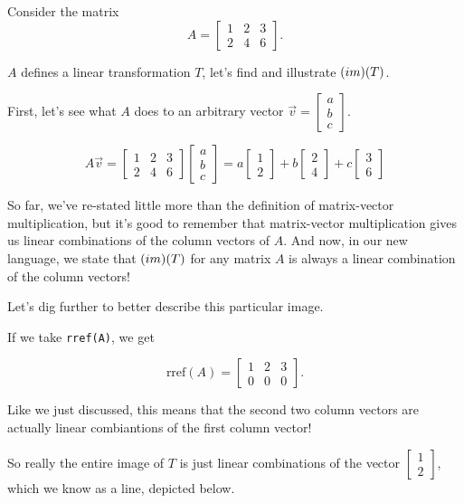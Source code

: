 \documentclass{ximera}
\begin{document}
\begin{example}\label{ex:image1}
Consider the matrix
$$A=\begin{bmatrix}1&2&3\\2&4&6\end{bmatrix}.$$

$A$ defines a linear transformation $T$, let's find and illustrate $\mbox(im)(T)$.
 

First, let's see what $A$ does to an arbitrary vector $\vec{v}=\begin{bmatrix}a\\b\\c\end{bmatrix}$.
 
$$A\vec{v}=\begin{bmatrix}1&2&3\\2&4&6\end{bmatrix}\begin{bmatrix}a\\b\\c\end{bmatrix}=a\begin{bmatrix}1\\2\end{bmatrix}+b\begin{bmatrix}2\\4\end{bmatrix}+c\begin{bmatrix}3\\6\end{bmatrix}$$
 
So far, we've re-stated little more than the definition of matrix-vector multiplication, but it's good to remember that matrix-vector multiplication gives us linear combinations of the column vectors of $A$. And now, in our new language, we state that $\mbox(im)(T)$ for any matrix $A$ is always a linear combination of the column vectors!

Let's dig further to better describe this particular image. 

If we take \texttt{rref(A)}, we get

$$\text{rref}(A)=\begin{bmatrix}1&2&3\\0&0&0\end{bmatrix}.$$

Like we just discussed, this means that the second two column vectors are actually linear combiantions of the first column vector!

So really the entire image of $T$ is just linear combinations of the vector $\begin{bmatrix}1\\2\end{bmatrix}$, which we know as a line, depicted below.
 

\end{example}
\end{document}
